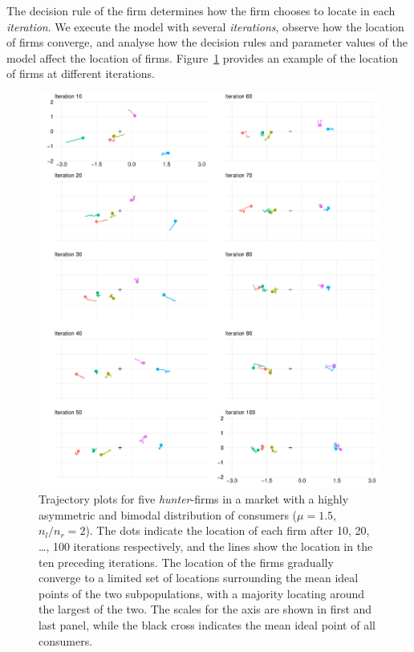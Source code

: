 \documentclass[preprint, 12pt]{elsarticle}
\begin{document}
The decision rule of the firm determines how the firm chooses to locate in each \emph{iteration}. We execute the model with several \emph{iterations}, observe how the location of firms converge, and analyse how the decision rules and parameter values of the model affect the location of firms. Figure~\ref{fig:movement} provides an example of the location of firms at different iterations.

\begin{figure}[htp!]
	\centering
	\includegraphics[width=\textwidth, trim={8mm 0 0 0}]{Graphics/figm.pdf}
	\caption{Trajectory plots for five \emph{hunter}-firms in a market with a highly asymmetric and bimodal distribution of consumers ($\mu=1.5$, $n_l/n_r=2$). The dots indicate the location of each firm after 10, 20, \dots, 100 iterations respectively, and the lines show the location in the ten preceding iterations. The location of the firms gradually converge to a limited set of locations surrounding the mean ideal points of the two subpopulations, with a majority locating around the largest of the two. The scales for the axis are shown in first and last panel, while the black cross indicates the mean ideal point of all consumers.}
	\label{fig:movement}
\end{figure}
\end{document}
